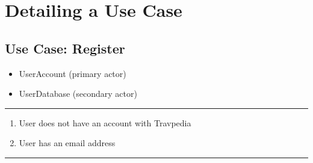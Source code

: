 \tablewidth

\hspace{-4.2cm}
\begin{minipage}[h][][s]{\linewidth}
	\section{Detailing a Use Case}
	\subsection{Use Case: Register}
\end{minipage}

\begin{itemize}
	\item UserAccount (primary actor)
	\item UserDatabase (secondary actor)
\end{itemize}
\noindent\rule{\textwidth}{0.6pt}

\begin{enumerate}
	\item User does not have an account with Travpedia
	\item User has an email address
\end{enumerate}
\noindent\rule{\textwidth}{0.6pt}

